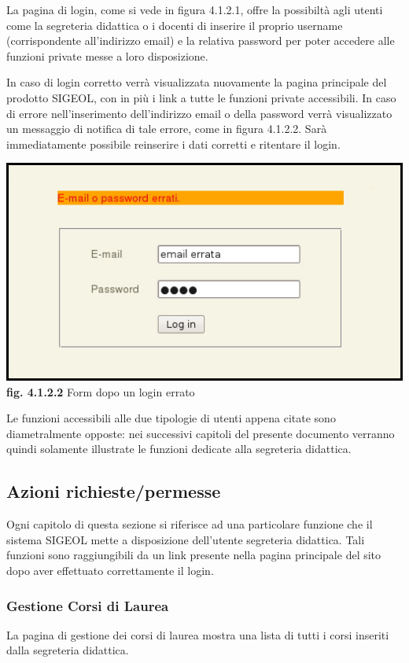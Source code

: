 \documentclass[11pt,a4paper]{article}
\begin{document}
La pagina di login, come si vede in figura 4.1.2.1, offre la possibiltà agli utenti come la segreteria didattica o i docenti di inserire il proprio username (corrispondente all'indirizzo email) e la relativa password per poter accedere alle funzioni private messe a loro disposizione.

In caso di login corretto verrà visualizzata nuovamente la pagina principale del prodotto SIGEOL, con in più i link a tutte le funzioni private accessibili.
In caso di errore nell'inserimento dell'indirizzo email o della password verrà visualizzato un messaggio di notifica di tale errore, come in figura 4.1.2.2.
Sarà immediatamente possibile reinserire i dati corretti e ritentare il login.

\begin{center}
	\includegraphics[scale=0.5]{images/login_errato.jpg}\\
	\textbf{fig. 4.1.2.2} Form dopo un login errato\\
\end{center}

Le funzioni accessibili alle due tipologie di utenti appena citate sono diametralmente opposte: nei successivi capitoli del presente documento verranno quindi solamente illustrate le funzioni dedicate alla segreteria didattica.
\subsection{Azioni richieste/permesse}
Ogni capitolo di questa sezione si riferisce ad una particolare funzione che il sistema SIGEOL mette a disposizione dell'utente segreteria didattica. Tali funzioni sono raggiungibili da un link presente nella pagina principale del sito dopo aver effettuato correttamente il login.
\subsubsection{Gestione Corsi di Laurea}
La pagina di gestione dei corsi di laurea mostra una lista di tutti i corsi inseriti dalla segreteria didattica.
\end{document}
